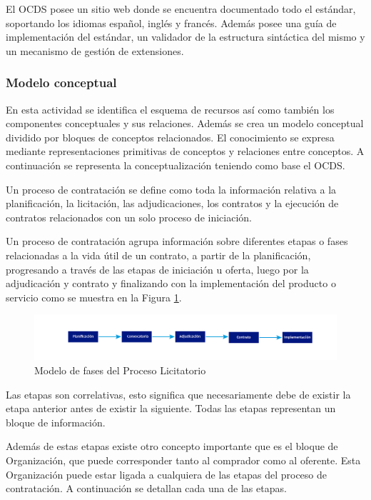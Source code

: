 El OCDS posee un sitio web donde se encuentra documentado todo el estándar, soportando los idiomas español, inglés y francés. Además posee una guía de implementación del estándar, un validador de la estructura sintáctica del mismo y un mecanismo de gestión de extensiones.

\subsubsection{Modelo conceptual}

En esta actividad se identifica el esquema de recursos así como también los componentes conceptuales y sus relaciones. Además se crea un modelo conceptual dividido por bloques de conceptos relacionados. El conocimiento se expresa mediante representaciones primitivas de conceptos y relaciones entre conceptos. A continuación se representa la conceptualización teniendo como base el OCDS.

Un proceso de contratación se define como toda la información relativa a la planificación, la licitación, las adjudicaciones, los contratos y la ejecución de contratos relacionados con un solo proceso de iniciación.

Un proceso de contratación agrupa información sobre diferentes etapas o fases relacionadas a la vida útil de un contrato, a partir de la planificación, progresando a través de las etapas de iniciación u oferta, luego por la adjudicación y contrato y finalizando con la implementación del producto o servicio como se muestra en la Figura \ref{img:fases del proceso licitatorio }.

\begin{figure}[!htbp]
    \centering
    \includegraphics[width=150mm]{figuras/Diagramas_ProcesoLicitatorio.png}
    \caption{Modelo de fases del Proceso Licitatorio}
    \label{img:fases del proceso licitatorio }
\end{figure}

Las etapas son correlativas, esto significa que necesariamente debe de existir la etapa anterior antes de existir la siguiente. Todas las etapas representan un bloque de información.

Además de estas etapas existe otro concepto importante que es el bloque de Organización, que puede corresponder tanto al comprador como al oferente. Esta Organización puede estar ligada a cualquiera de las etapas del proceso de contratación. A continuación se detallan cada una de las etapas.
